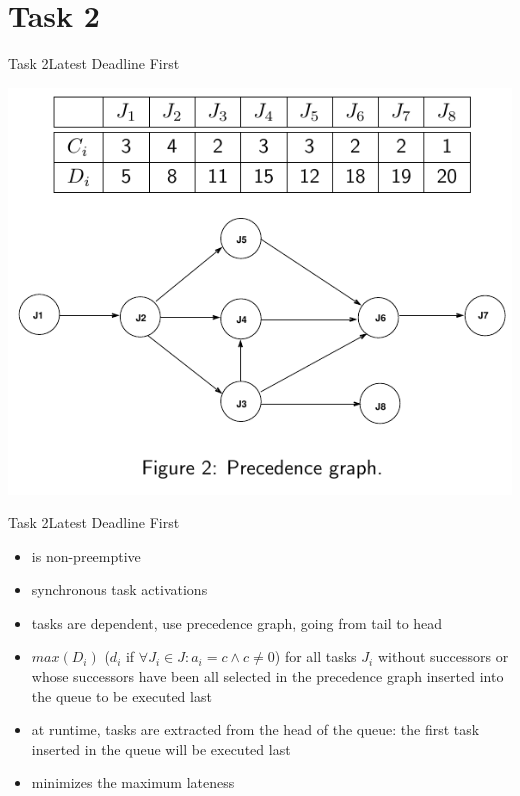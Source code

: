 
\section{Task 2}

\setcounter{task}{1}

\begin{frame}[shrink=10]{Task 2}{Latest Deadline First}
  \vspace{0.5cm}
  \begin{tasknoinc}
    \centering
    \includegraphics[height=0.7\paperheight]{./figures/2_tab_graph.png}
  \end{tasknoinc}
\end{frame}

\begin{frame}{Task 2}{Latest Deadline First}
  \begin{requirements}
    \begin{itemize}
      \item is \alert{non-preemptive}
      \item \alert{synchronous task activations}
      \item tasks are \alert{dependent}, use \alert{precedence graph}, going from \alert{tail} to \alert{head}
      \item $max(D_i)$ ($d_i$ if $\forall J_i\in J: a_i=c \wedge c\ne 0$) for all tasks $J_i$ \alert{without successors} or whose \alert{successors} have been all selected in the \alert{precedence graph} inserted into the queue to be \alert{executed last}
      \item at runtime, tasks are extracted from the \alert{head of the queue:} the \alert{first task} inserted in the queue will be \alert{executed last}
      \item \alert{minimizes} the \alert{maximum lateness}
    \end{itemize}
  \end{requirements}
\end{frame}

